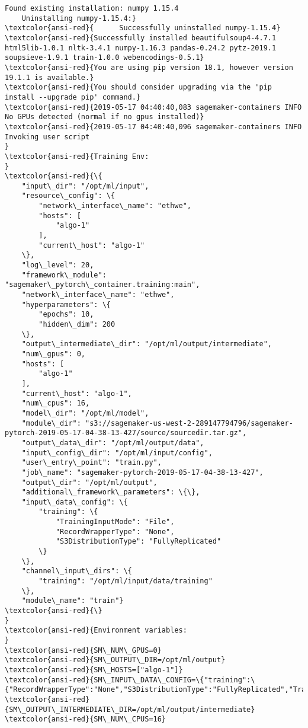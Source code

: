 \documentclass[11pt]{article}
\begin{document}
\begin{Verbatim}[commandchars=\\\{\}]
  Found existing installation: numpy 1.15.4
    Uninstalling numpy-1.15.4:}
\textcolor{ansi-red}{      Successfully uninstalled numpy-1.15.4}
\textcolor{ansi-red}{Successfully installed beautifulsoup4-4.7.1 html5lib-1.0.1 nltk-3.4.1 numpy-1.16.3 pandas-0.24.2 pytz-2019.1 soupsieve-1.9.1 train-1.0.0 webencodings-0.5.1}
\textcolor{ansi-red}{You are using pip version 18.1, however version 19.1.1 is available.}
\textcolor{ansi-red}{You should consider upgrading via the 'pip install --upgrade pip' command.}
\textcolor{ansi-red}{2019-05-17 04:40:40,083 sagemaker-containers INFO     No GPUs detected (normal if no gpus installed)}
\textcolor{ansi-red}{2019-05-17 04:40:40,096 sagemaker-containers INFO     Invoking user script
}
\textcolor{ansi-red}{Training Env:
}
\textcolor{ansi-red}{\{
    "input\_dir": "/opt/ml/input",
    "resource\_config": \{
        "network\_interface\_name": "ethwe",
        "hosts": [
            "algo-1"
        ],
        "current\_host": "algo-1"
    \},
    "log\_level": 20,
    "framework\_module": "sagemaker\_pytorch\_container.training:main",
    "network\_interface\_name": "ethwe",
    "hyperparameters": \{
        "epochs": 10,
        "hidden\_dim": 200
    \},
    "output\_intermediate\_dir": "/opt/ml/output/intermediate",
    "num\_gpus": 0,
    "hosts": [
        "algo-1"
    ],
    "current\_host": "algo-1",
    "num\_cpus": 16,
    "model\_dir": "/opt/ml/model",
    "module\_dir": "s3://sagemaker-us-west-2-289147794796/sagemaker-pytorch-2019-05-17-04-38-13-427/source/sourcedir.tar.gz",
    "output\_data\_dir": "/opt/ml/output/data",
    "input\_config\_dir": "/opt/ml/input/config",
    "user\_entry\_point": "train.py",
    "job\_name": "sagemaker-pytorch-2019-05-17-04-38-13-427",
    "output\_dir": "/opt/ml/output",
    "additional\_framework\_parameters": \{\},
    "input\_data\_config": \{
        "training": \{
            "TrainingInputMode": "File",
            "RecordWrapperType": "None",
            "S3DistributionType": "FullyReplicated"
        \}
    \},
    "channel\_input\_dirs": \{
        "training": "/opt/ml/input/data/training"
    \},
    "module\_name": "train"}
\textcolor{ansi-red}{\}
}
\textcolor{ansi-red}{Environment variables:
}
\textcolor{ansi-red}{SM\_NUM\_GPUS=0}
\textcolor{ansi-red}{SM\_OUTPUT\_DIR=/opt/ml/output}
\textcolor{ansi-red}{SM\_HOSTS=["algo-1"]}
\textcolor{ansi-red}{SM\_INPUT\_DATA\_CONFIG=\{"training":\{"RecordWrapperType":"None","S3DistributionType":"FullyReplicated","TrainingInputMode":"File"\}\}}
\textcolor{ansi-red}{SM\_OUTPUT\_INTERMEDIATE\_DIR=/opt/ml/output/intermediate}
\textcolor{ansi-red}{SM\_NUM\_CPUS=16}

\end{Verbatim}
\end{document}

